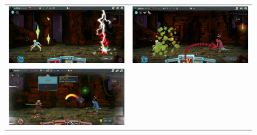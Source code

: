 \documentclass[12pt]{amsart}
\begin{document}
\begin{figure}[h]
    \centering
    \begin{tabular}{c|c}
        \includegraphics[scale=.3]{graphics/SmokeBomb1.png} & \includegraphics[scale=.3]{graphics/SmokeBomb2.png}
        \\
        \includegraphics[scale=.3]{graphics/SmokeBomb4.png} &

\end{tabular}
\end{figure}
\end{document}
